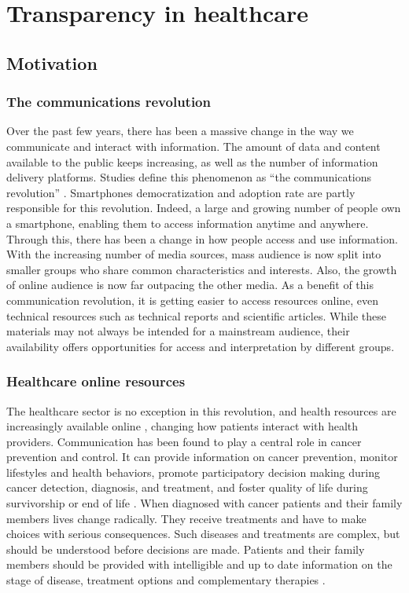 \chapter{Transparency in healthcare}

\section{Motivation}

\subsection{The communications revolution}

Over the past few years, there has been a massive change in the way we
communicate and interact with information. The amount of data and content
available to the public keeps increasing, as well as the number of information
delivery platforms. Studies define this phenomenon as ``the communications
revolution'' \cite{viswanath_communications_2012}. Smartphones democratization
and adoption rate are partly responsible for this revolution. Indeed, a large
and growing number of people own a smartphone, enabling them to access
information anytime and anywhere. Through this, there has been a change in how
people access and use information. With the increasing number of media sources,
mass audience is now split into smaller groups who share common characteristics
and interests. Also, the growth of online audience is now far outpacing the
other media. As a benefit of this communication revolution, it is getting easier
to access resources online, even technical resources such as technical reports
and scientific articles. While these materials may not always be intended for a
mainstream audience, their availability offers opportunities for access and
interpretation by different groups.

\subsection{Healthcare online resources}

The healthcare sector is no exception in this revolution, and health resources
are increasingly available online
\cite{viswanath_science_2005,viswanath_communications_2012}, changing how
patients interact with health providers. Communication has been found to play a
central role in cancer prevention and control. It can provide information on
cancer prevention, monitor lifestyles and health behaviors, promote
participatory decision making during cancer detection, diagnosis, and treatment,
and foster quality of life during survivorship or end of life
\cite{viswanath_communications_2012}. When diagnosed with cancer patients and
their family members lives change radically. They receive treatments and have to
make choices with serious consequences. Such diseases and treatments are
complex, but should be understood before decisions are made. Patients and their
family members should be provided with intelligible and up to date information
on the stage of disease, treatment options and complementary therapies
\cite{butow_dynamics_1997,cassileth_information_1980}.

